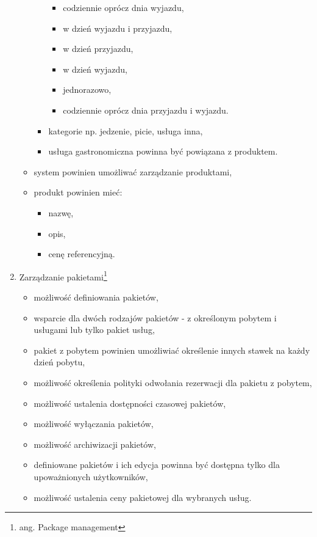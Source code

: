\documentclass[a4paper,onecolumn,oneside,11pt,wide,floatssmall]{mwrep}
\theoremstyle{definition}
\theoremstyle{plain}%
\theoremstyle{remark}
\begin{document}
\begin{enumerate}
\begin{itemize}
\begin{itemize}
\begin{itemize}
              \item codziennie oprócz dnia wyjazdu,
              \item w dzień wyjazdu i przyjazdu,
              \item w dzień przyjazdu,
              \item w dzień wyjazdu,
              \item jednorazowo,
              \item codziennie oprócz dnia przyjazdu i wyjazdu.
            \end{itemize}
          \item kategorie np. jedzenie, picie, usługa inna,
          \item usługa gastronomiczna powinna być powiązana z produktem.
        \end{itemize}
        \item system powinien umożliwać zarządzanie produktami,
        \item produkt powinien mieć:
          \begin{itemize}
            \item nazwę,
            \item opis,
            \item cenę referencyjną.
          \end{itemize}
    \end{itemize}
  \item Zarządzanie pakietami\footnote{ang. Package management}
    \begin{itemize}
      \item możliwość definiowania pakietów,
      \item wsparcie dla dwóch rodzajów pakietów - z określonym pobytem i usługami lub tylko pakiet usług,
      \item pakiet z pobytem powinien umożliwiać określenie innych stawek na każdy dzień pobytu,
      \item możliwość określenia polityki odwołania rezerwacji dla pakietu z pobytem,
      \item możliwość ustalenia dostępności czasowej pakietów,
      \item możliwość wyłączania pakietów,
      \item możliwość archiwizacji pakietów,
      \item definiowane pakietów i ich edycja powinna być dostępna tylko dla upoważnionych użytkowników,
      \item możliwość ustalenia ceny pakietowej dla wybranych usług.

\end{itemize}
\end{enumerate}
\end{document}
